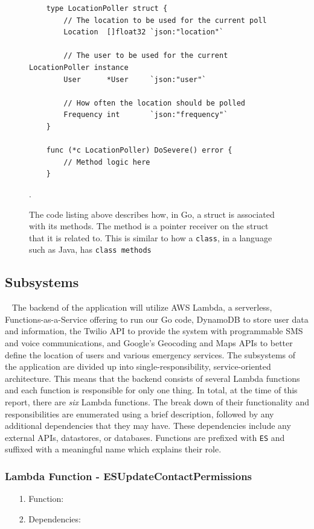 \documentclass[10pt, a4paper]{article}
\begin{document}
\begin{figure}[H]
	\begin{center}
	\begin{lstlisting}
	type LocationPoller struct {
		// The location to be used for the current poll
		Location  []float32 `json:"location"`
		
		// The user to be used for the current LocationPoller instance
		User      *User     `json:"user"`
		
		// How often the location should be polled	
		Frequency int       `json:"frequency"`
	}

	func (*c LocationPoller) DoSevere() error {
		// Method logic here	
	}
	\end{lstlisting}
	\end{center}
\caption{The code listing above describes how, in Go, a struct is associated with its methods. The method is a pointer receiver on the struct that it is related to. This is similar to how a \texttt{class}, in a language such as Java, has \texttt{class methods}}.
\end{figure}

\subsection{Subsystems}
\par ~ The backend of the application will utilize AWS Lambda, a serverless, Functions-as-a-Service offering to run our Go code, DynamoDB to store user data and information, the Twilio API to provide the system with programmable SMS and voice communications, and Google's Geocoding and Maps APIs to better define the location of users and various emergency services. The subsystems of the application are divided up into single-responsibility, service-oriented architecture. This means that the backend consists of several Lambda functions and each function is responsible for only one thing. In total, at the time of this report, there are \emph{six} Lambda functions. The break down of their functionality and responsibilities are enumerated using a brief description, followed by any additional dependencies that they may have. These dependencies include any external APIs, datastores, or databases. Functions are prefixed with \texttt{ES} and suffixed with a meaningful name which explains their role.

\subsubsection{Lambda Function - ESUpdateContactPermissions}
\begin{enumerate}
	\item[1.] Function: 
	\item[2.] Dependencies: 
\end{enumerate}
\end{document}
